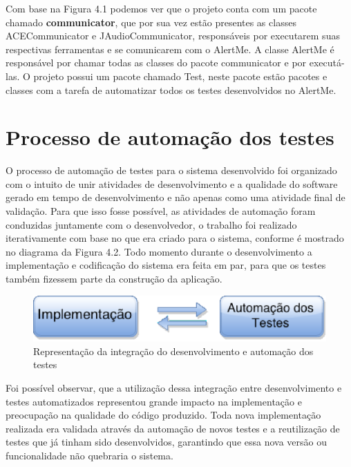 Com base na Figura 4.1 podemos ver que o projeto conta com um pacote chamado \textbf{communicator}, que por sua vez estão presentes as classes ACECommunicator e JAudioCommunicator, responsáveis por executarem suas respectivas ferramentas e se comunicarem com o AlertMe. A classe AlertMe é responsável por chamar todas as classes do pacote communicator e por executá-las. O projeto possui um pacote chamado Test, neste pacote estão pacotes e classes com a tarefa de automatizar todos os testes desenvolvidos no AlertMe. 

\section{Processo de automação dos testes}

O processo de automação de testes para o sistema desenvolvido foi organizado com o intuito de unir atividades de desenvolvimento e a qualidade do software gerado em tempo de desenvolvimento e não apenas como uma atividade final de validação. Para que isso fosse possível, as atividades de automação foram conduzidas juntamente com o desenvolvedor, o trabalho foi realizado iterativamente com base no que era criado para o sistema, conforme é mostrado no diagrama da Figura 4.2. Todo momento durante o desenvolvimento a implementação e codificação do sistema era feita em par, para que os testes também fizessem parte da construção da aplicação. 

\begin{figure}[H]
	\centering
	\captionsetup{justification=centering,margin=2cm}
	\includegraphics[scale=0.80]{capitulos/validacao/figuras/automationTestProcess.eps}
	\caption{Representação da integração do desenvolvimento e automação dos testes}
	\label{fig:result-engajamento}
\end{figure}

Foi possível observar, que a utilização dessa integração entre desenvolvimento e testes automatizados representou grande impacto na implementação e preocupação na qualidade do código produzido. Toda nova implementação realizada era validada através da automação de novos testes e a reutilização de testes que já tinham sido desenvolvidos, garantindo que essa nova versão ou funcionalidade não quebraria o sistema.

